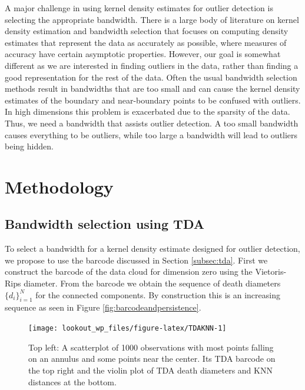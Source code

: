 \documentclass[11pt,a4paper,]{article}
\theoremstyle{definition}
\theoremstyle{definition}
\theoremstyle{definition}
\theoremstyle{remark}
\begin{document}
A major challenge in using kernel density estimates for outlier detection is selecting the appropriate bandwidth. There is a large body of literature on kernel density estimation and bandwidth selection \autocite{Scott1994,Wang2019} that focuses on computing density estimates that represent the data as accurately as possible, where measures of accuracy have certain asymptotic properties. However, our goal is somewhat different as we are interested in finding outliers in the data, rather than finding a good representation for the rest of the data. Often the usual bandwidth selection methods result in bandwidths that are too small and can cause the kernel density estimates of the boundary and near-boundary points to be confused with outliers. In high dimensions this problem is exacerbated due to the sparsity of the data. Thus, we need a bandwidth that assists outlier detection. A too small bandwidth causes everything to be outliers, while too large a bandwidth will lead to outliers being hidden.

\hypertarget{sec:lookout}{%
\section{Methodology}\label{sec:lookout}}

\hypertarget{subsec:selectingBandwidth}{%
\subsection{Bandwidth selection using TDA}\label{subsec:selectingBandwidth}}

To select a bandwidth for a kernel density estimate designed for outlier detection, we propose to use the barcode discussed in Section \ref{subsec:tda}. First we construct the barcode of the data cloud for dimension zero using the Vietoris-Rips diameter. From the barcode we obtain the sequence of death diameters \(\{d_i\}_{i = 1}^N\) for the connected components. By construction this is an increasing sequence as seen in Figure \ref{fig:barcodeandpersistence}.

\begin{figure}
\texttt{[image: lookout\_wp\_files/figure-latex/TDAKNN-1]} \caption{Top left: A scatterplot of 1000 observations with most points falling on an annulus and some points near the center. Its TDA barcode on the top right and the violin plot of TDA death diameters and KNN distances at the bottom.}\label{fig:TDAKNN}
\end{figure}
\end{document}

